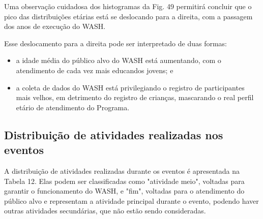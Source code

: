 Uma observação cuidadosa dos histogramas da Fig. 49 permitirá concluir que o pico das distribuições etárias está se deslocando para a direita, com a passagem dos anos de execução do WASH.

Esse deslocamento para a direita pode ser interpretado de duas formas:


\begin{itemize}
\item a idade média do público alvo do WASH está aumentando, com o atendimento de cada vez mais educandos jovens; e
\item a coleta de dados do WASH está privilegiando o registro de participantes mais velhos, em detrimento do registro de crianças, mascarando o real perfil etário de atendimento do Programa.
\end{itemize}

\subsection[Distribuição de atividades realizadas nos eventos]{Distribuição de atividades realizadas nos eventos}\label{Distribuição de atividades realizadas nos eventos}
A distribuição de atividades realizadas durante os eventos é apresentada na Tabela 12. Elas podem ser classificadas como "atividade meio", voltadas para garantir o funcionamento do WASH, e "fim", voltadas para o atendimento do público alvo e representam a atividade principal durante o evento, podendo haver outras atividades secundárias, que não estão sendo consideradas.





